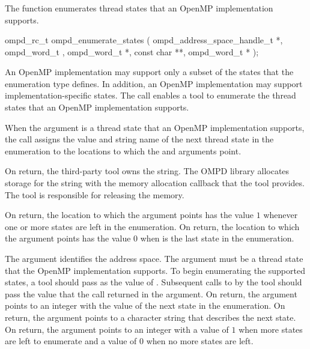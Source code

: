 \subsubsection{}
\label{subsubsubsec:ompd_enumerate_states}

\summary
The  function enumerates thread states 
that an OpenMP implementation supports.

\format
\begin{cspecific}
\begin{ompSyntax}
ompd_rc_t ompd_enumerate_states (
  ompd_address_space_handle_t *,
  ompd_word_t ,
  ompd_word_t *,
  const char **,
  ompd_word_t *
);
\end{ompSyntax}
\end{cspecific}

\descr
An OpenMP implementation may support only a subset of the states that 
the  enumeration type defines. In addition, an
OpenMP implementation may support implementation-specific states.
The  call enables a tool to enumerate 
the thread states that an OpenMP implementation supports.

When the  argument is a thread state that an OpenMP 
implementation supports, the call assigns the value and string name of 
the next thread state in the enumeration to the locations to which the 
 and  arguments point.

On return, the third-party tool owns the  string.
The OMPD library allocates storage for the string with the memory allocation 
callback that the tool provides. The tool is responsible for releasing the memory.

On return, the location to which the  argument points has
the value $1$ whenever one or more states are left in the enumeration. On
return, the location to which the  argument points
has the value $0$ when  is the last state in the enumeration.

\argdesc
The  argument identifies the address space. 
The  argument must be a thread state that the OpenMP 
implementation supports. To begin enumerating the supported states, a 
tool should pass  as the value of .
Subsequent calls to  by the tool should pass the
value that the call returned in the  argument. On return, the 
 argument points to an integer with the value of the next state 
in the enumeration. On return, the  argument points to a 
character string that describes the next state. On return, the  
argument points to an integer with a value of $1$ when more states are left to 
enumerate and a value of $0$ when no more states are left.

